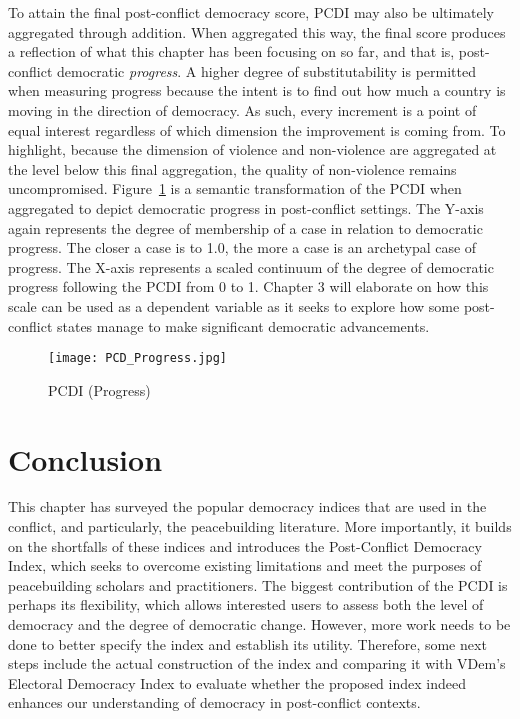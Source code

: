 \documentclass [11pt]{article}
\begin{document}
To attain the final post-conflict democracy score, PCDI may also be ultimately aggregated through addition. When aggregated this way, the final score produces a reflection of what this chapter has been focusing on so far, and that is, post-conflict democratic \emph{progress}. A higher degree of substitutability is permitted when measuring progress because the intent is to find out how much a country is moving in the direction of democracy. As such, every increment is a point of equal interest regardless of which dimension the improvement is coming from. To highlight, because the dimension of violence and non-violence are aggregated at the level below this final aggregation, the quality of non-violence remains uncompromised. Figure~\ref{fig5} is a semantic transformation of the PCDI when aggregated to depict democratic progress in post-conflict settings. The Y-axis again represents the degree of membership of a case in relation to democratic progress. The closer a case is to 1.0, the more a case is an archetypal case of progress. The X-axis represents a scaled continuum of the degree of democratic progress following the PCDI from 0 to 1. Chapter 3 will elaborate on how this scale can be used as a dependent variable as it seeks to explore how some post-conflict states manage to make significant democratic advancements.

\begin{figure} [h!]

\caption{PCDI (Progress)}
\label{fig5}%
\begin{center} 
\small
 \texttt{[image: PCD\_Progress.jpg]}
\end{center} 
\end{figure}

\section*{Conclusion}

This chapter has surveyed the popular democracy indices that are used in the conflict, and particularly, the peacebuilding literature. More importantly, it builds on the shortfalls of these indices and introduces the Post-Conflict Democracy Index, which seeks to overcome existing limitations and meet the purposes of peacebuilding scholars and practitioners. The biggest contribution of the PCDI is perhaps its flexibility, which allows interested users to assess both the level of democracy and the degree of democratic change. However, more work needs to be done to better specify the index and establish its utility. Therefore, some next steps include the actual construction of the index and comparing it with VDem's Electoral Democracy Index to evaluate whether the proposed index indeed enhances our understanding of democracy in post-conflict contexts.
\end{document}
